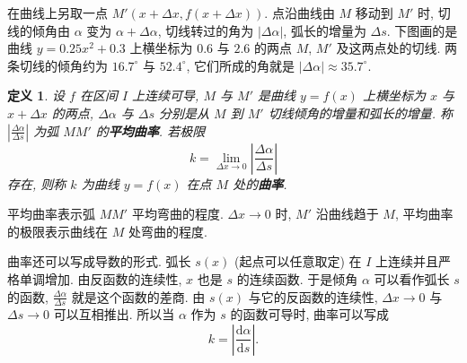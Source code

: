 \documentclass[UTF8,openany]{ctexbook}
\theoremstyle{chinesetextbook}
\newtheorem{definition}{定义}[section]
\newcommand{\dd}{\mathrm d}
\begin{document}
在曲线上另取一点 $M'(x+\Delta x,f(x+\Delta x))$. 点沿曲线由 $M$ 移动到 $M'$ 时, 切线的倾角由 $\alpha$ 变为 $\alpha+\Delta\alpha$, 切线转过的角为 $|\Delta\alpha|$, 弧长的增量为 $\Delta s$. 下图画的是曲线 $y=0.25x^2+0.3$ 上横坐标为 $0.6$ 与 $2.6$ 的两点 $M$, $M'$ 及这两点处的切线. 两条切线的倾角约为 $16.7^\circ$ 与 $52.4^\circ$, 它们所成的角就是 $|\Delta\alpha|\approx35.7^\circ$.
\begin{center}
\end{center}

\begin{definition}\label{def:c2-11-curv}
设 $f$ 在区间 $I$ 上连续可导, $M$ 与 $M'$ 是曲线 $y=f(x)$ 上横坐标为 $x$ 与 $x+\Delta x$ 的两点, $\Delta\alpha$ 与 $\Delta s$ 分别是从 $M$ 到 $M'$ 切线倾角的增量和弧长的增量. 称 $\displaystyle\left|\frac{\Delta\alpha}{\Delta s}\right|$ 为弧 $MM'$ 的\textbf{平均曲率}. 若极限
\[
k=\lim_{\Delta x\to0}\left|\frac{\Delta\alpha}{\Delta s}\right|
\]
存在, 则称 $k$ 为曲线 $y=f(x)$ 在点 $M$ 处的\textbf{曲率}.
\end{definition}
平均曲率表示弧 $MM'$ 平均弯曲的程度. $\Delta x\to0$ 时, $M'$ 沿曲线趋于 $M$, 平均曲率的极限表示曲线在 $M$ 处弯曲的程度.

曲率还可以写成导数的形式. 弧长 $s(x)$ (起点可以任意取定) 在 $I$ 上连续并且严格单调增加. 由反函数的连续性, $x$ 也是 $s$ 的连续函数. 于是倾角 $\alpha$ 可以看作弧长 $s$ 的函数, $\displaystyle\frac{\Delta\alpha}{\Delta s}$ 就是这个函数的差商. 由 $s(x)$ 与它的反函数的连续性, $\Delta x\to0$ 与 $\Delta s\to0$ 可以互相推出. 所以当 $\alpha$ 作为 $s$ 的函数可导时, 曲率可以写成
\[
k=\left|\frac{\dd\alpha}{\dd s}\right|.
\]
\end{document}
